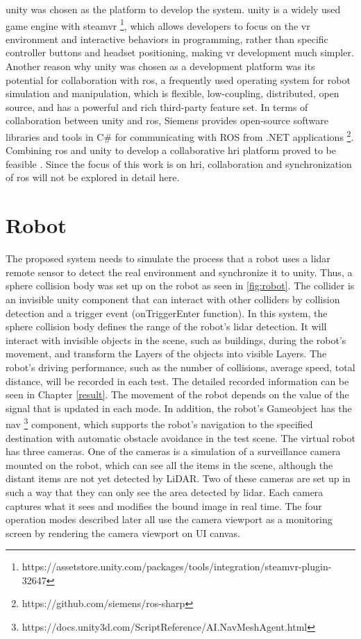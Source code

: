 \gls{unity} was chosen as the platform to develop the system. \gls{unity} is a widely used game engine with \gls{steamvr} \footnote{https://assetstore.unity.com/packages/tools/integration/steamvr-plugin-32647}, which allows developers to focus on the \gls{vr} environment and interactive behaviors in programming, rather than specific controller buttons and headset positioning, making \gls{vr} development much simpler. Another reason why \gls{unity} was chosen as a development platform was its potential for collaboration with \gls{ros}, a frequently used operating system for robot simulation and manipulation, which is flexible, low-coupling, distributed, open source, and has a powerful and rich third-party feature set. In terms of collaboration between \gls{unity} and \gls{ros}, Siemens provides open-source software libraries and tools in C\# for communicating with ROS from .NET applications \footnote{https://github.com/siemens/ros-sharp}. Combining \gls{ros} and \gls{unity} to develop a collaborative \gls{hri} platform proved to be feasible \cite{Whitney:2018wk}. Since the focus of this work is on \gls{hri}, collaboration and synchronization of \gls{ros} will not be explored in detail here.

\section{Robot}
The proposed system needs to simulate the process that a robot uses a \gls{lidar} remote sensor to detect the real environment and synchronize it to \gls{unity}. Thus, a sphere collision body was set up on the robot as seen in \ref{fig:robot}. The collider is an invisible \gls{unity} component that can interact with other colliders by collision detection and a trigger event (onTriggerEnter function). In this system, the sphere collision body defines the range of the robot's \gls{lidar} detection. It will interact with invisible objects in the scene, such as buildings, during the robot's movement, and transform the Layers of the objects into visible Layers. The robot's driving performance, such as the number of collisions, average speed, total distance, will be recorded in each test. The detailed recorded information can be seen in Chapter \ref{result}. The movement of the robot depends on the value of the signal that is updated in each mode. In addition, the robot's Gameobject has the \gls{nav} \footnote{https://docs.unity3d.com/ScriptReference/AI.NavMeshAgent.html} component, which supports the robot's navigation to the specified destination with automatic obstacle avoidance in the test scene. The virtual robot has three cameras. One of the cameras is a simulation of a surveillance camera mounted on the robot, which can see all the items in the scene, although the distant items are not yet detected by LiDAR. Two of these cameras are set up in such a way that they can only see the area detected by \gls{lidar}. Each camera captures what it sees and modifies the bound image in real time. The four operation modes described later all use the camera viewport as a monitoring screen by rendering the camera viewport on UI canvas.


